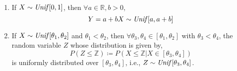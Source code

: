 \begin{theorem} \quad                                                        \\
\begin{enumerate}[noitemsep, topsep=0em]
\item
    If $X \sim \text{\emph{Unif}}[0, 1]$, then $\forall a \in \mathbb{R}, b > 0$,
\[ 
    Y = a + bX \sim \text{\emph{Unif}}[a, a + b]
\]
\item
    If $X \sim \text{\emph{Unif}}[\theta_1, \theta_2]$ and $\theta_1 < \theta_2$,
then $\forall \theta_3, \theta_4 \in [\theta_1, \theta_2]$ with $\theta_3 <
\theta_4$, the random variable $Z$ whose distribution is given by,
\[
    P(Z \leq \mathbb{Z}) \coloneqq P(X \leq \mathbb{Z} \vert 
                                     X \in [\theta_3, \theta_4])
\]
is uniformly distributed over $[\theta_3, \theta_4]$, i.e., $Z \sim
\text{\emph{Unif}}[\theta_3, \theta_4]$.
\end{enumerate}
\end{theorem}
